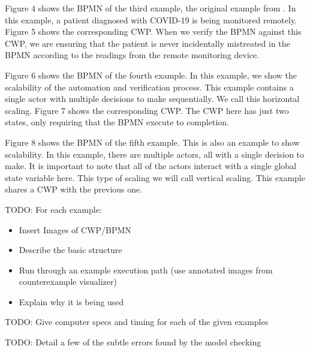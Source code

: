 Figure 4 shows the BPMN of the third example, the original example from \cite{mercer22}. In this example, a patient diagnosed with COVID-19 is being monitored remotely. Figure 5 shows the corresponding CWP. When we verify the BPMN against this CWP, we are ensuring that the patient is never incidentally mistreated in the BPMN according to the readings from the remote monitoring device.

Figure 6 shows the BPMN of the fourth example. In this example, we show the scalability of the automation and verification process. This example contains a single actor with multiple decisions to make sequentially. We call this horizontal scaling. Figure 7 shows the corresponding CWP. The CWP here has just two states, only requiring that the BPMN execute to completion.

Figure 8 shows the BPMN of the fifth example. This is also an example to show scalability. In this example, there are multiple actors, all with a single decision to make. It is important to note that all of the actors interact with a single global state variable here. This type of scaling we will call vertical scaling. This example shares a CWP with the previous one.

TODO: For each example:
\begin{itemize}
    \item Insert Images of CWP/BPMN
    \item Describe the basic structure
    \item Run through an example execution path (use annotated images from counterexample visualizer)
    \item Explain why it is being used
\end{itemize}

TODO: Give computer specs and timing for each of the given examples

TODO: Detail a few of the subtle errors found by the model checking


